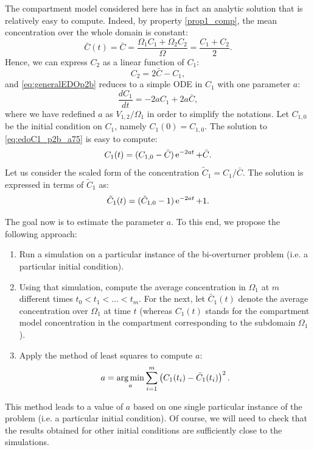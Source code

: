 The compartment model considered here has in fact an analytic solution that is relatively easy to compute. Indeed, by property \ref{prop1_comp}, the mean concentration over the whole domain is constant:
\begin{equation}
	\bar C(t) = \bar C = \frac{\Omega_1 C_1 + \Omega_2 C_2}{\Omega} = \frac{C_1 + C_2}{2}.
\end{equation}
Hence, we can express $C_2$ as a linear function of $C_1$:
\begin{equation}
	C_2 = 2\bar C - C_1,
\end{equation}
and \eqref{eq:generalEDOp2b} reduces to a simple ODE in $C_1$ with one parameter $a$:
\begin{equation} \label{eq:edoC1_p2b_a75}
	\frac{dC_1}{dt} = -2aC_1 + 2a\bar C,
\end{equation}
where we have redefined $a$ as $V_{1,2}/\Omega_1$ in order to simplify the notations. Let $C_{1,0}$ be the initial condition on $C_1$, namely $C_1(0) = C_{1,0}$. The solution to \eqref{eq:edoC1_p2b_a75} is easy to compute:
\begin{equation}
	C_1(t) = (C_{1,0} - \bar C) \operatorname{e}^{-2at} + \bar C.
\end{equation}
Let us consider the scaled form of the concentration $\tilde C_1 = C_1/\bar C$. The solution is expressed in terms of $\tilde C_1$ as:
\begin{equation}
	\tilde C_1(t) = (\tilde C_{1,0} - 1) \operatorname{e}^{-2at} + 1.
\end{equation}

The goal now is to estimate the parameter $a$. To this end, we propose the following approach:
\begin{enumerate}
	\item Run a simulation on a particular instance of the bi-overturner problem (i.e. a particular initial condition).
	\item Using that simulation, compute the average concentration in $\Omega_1$ at $m$ different times $t_0 < t_1 < \dots < t_m$. For the next, let $\bar C_1(t)$ denote the average concentration over $\Omega_1$ at time $t$ (whereas $C_1(t)$ stands for the compartment model concentration in the compartment corresponding to the subdomain $\Omega_1$).
	\item Apply the method of least squares to compute $a$:
	\begin{equation} \label{eq:a_minimization}
		a = \operatorname*{arg\,min}_a \sum_{i=1}^m \left(C_1(t_i)-\bar C_1(t_i)\right)^2.
	\end{equation}
\end{enumerate}
This method leads to a value of $a$ based on one single particular instance of the problem (i.e. a particular initial condition). Of course, we will need to check that the results obtained for other initial conditions are sufficiently close to the simulations.

